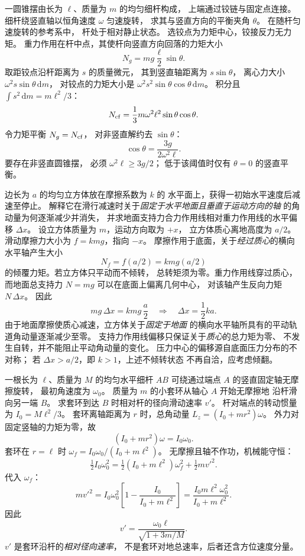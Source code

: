 一圆锥摆由长为 $\ell$、质量为 $m$ 的均匀细杆构成，
上端通过铰链与固定点连接。
细杆绕竖直轴以恒角速度 $\omega$ 匀速旋转，
求其与竖直方向的平衡夹角 $\theta$。
\exsolution
在随杆匀速旋转的参考系中，
杆处于相对静止状态。
选铰点为力矩中心，铰接反力无力矩。
重力作用在杆中点，其使杆向竖直方向回落的力矩大小
\[
N_g=mg\frac{\ell}{2}\sin\theta.
\]
取距铰点沿杆距离为 $s$ 的质量微元，
其到竖直轴距离为 $s\sin\theta$，
离心力大小 $\omega^2s\sin\theta\,\mathrm dm$，
对铰点的力矩大小是
$\omega^2s^2\sin\theta\cos\theta\,\mathrm dm$。
积分且 $\int s^2\,\mathrm dm=m\ell^2/3$：
\[
N_{\rm cf}=\frac13m\omega^2\ell^2
\sin\theta\cos\theta.
\]
令力矩平衡 $N_g=N_{\rm cf}$，
对非竖直解约去 $\sin\theta$：
\[
\boxed{\cos\theta=\frac{3g}{2\omega^2\ell}}.
\]
\excheck 要存在非竖直圆锥摆，
必须 $\omega^2\ell\ge3g/2$；
低于该阈值时仅有 $\theta=0$ 的竖直平衡。


边长为 $a$ 的均匀立方体放在摩擦系数为 $k$ 的
水平面上，获得一初始水平速度后减速至停止。
解释它在滑行减速时关于\emph{固定于水平地面且垂直于运动方向的轴}
的角动量为何逐渐减少并消失，
并求地面支持力合力作用线相对重力作用线的水平偏移
$\Delta x$。
\exsolution
设立方体质量为 $m$，运动方向取为 $+x$，
立方体质心离地高度为 $a/2$。
滑动摩擦力大小为 $f=kmg$，指向 $-x$。
摩擦作用于底面，关于\emph{经过质心}的横向水平轴产生大小
\[
N_f=f(a/2)=kmg(a/2)
\]
的倾覆力矩。若立方体只平动而不倾转，
总转矩须为零。重力作用线穿过质心，
而地面总支持力 $N=mg$ 可以在底面上偏离几何中心，
对该轴产生反向力矩 $N\,\Delta x$。
因此
\[
mg\,\Delta x=kmg\,\frac a2
\quad\Longrightarrow\quad
\boxed{\Delta x=\frac12ka}.
\]
由于地面摩擦使质心减速，立方体关于\emph{固定于地面}
的横向水平轴所具有的平动轨道角动量逐渐减少至零。
支持力作用线偏移只保证关于\emph{质心}的总力矩为零、
不发生自转，并不能阻止平动角动量的变化。
\excheck 压力中心的偏移源自底面压力分布的不对称；
若 $\Delta x>a/2$，即 $k>1$，上述不倾转状态
不再自洽，应考虑倾翻。

一根长为 $\ell$、质量为 $M$ 的均匀水平细杆 $AB$
可绕通过端点 $A$ 的竖直固定轴无摩擦旋转，
最初角速度为 $\omega_0$。
质量为 $m$ 的小套环从轴心 $A$ 开始无摩擦地
沿杆滑向另一端 $B$。
求套环到达 $B$ 时相对杆的径向滑动速率 $v'$。
\exsolution
杆对端点的转动惯量为
$I_0=M\ell^2/3$。
套环离轴距离为 $r$ 时，总角动量
$L_z=(I_0+mr^2)\omega$。
外力对固定竖轴的力矩为零，故
\[
(I_0+mr^2)\omega=I_0\omega_0.
\]
套环在 $r=\ell$ 时
$\omega_f=I_0\omega_0/(I_0+m\ell^2)$。
无摩擦且轴不作功，机械能守恒：
\[
\tfrac12I_0\omega_0^2
=\tfrac12(I_0+m\ell^2)\omega_f^2
+\tfrac12m{v'}^2.
\]
代入 $\omega_f$：
\[
m{v'}^2
=I_0\omega_0^2
\left[1-\frac{I_0}{I_0+m\ell^2}\right]
=\frac{I_0m\ell^2\omega_0^2}{I_0+m\ell^2}.
\]
因此
\[
\boxed{v'=\frac{\omega_0\ell}{\sqrt{1+3m/M}}}.
\]
\excheck $v'$ 是套环沿杆的\emph{相对径向速率}，
不是套环对地总速率，后者还含方位速度分量。

